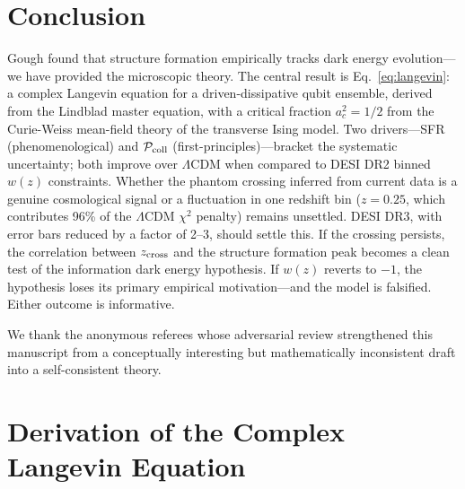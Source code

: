\documentclass[aps,prd,twocolumn,superscriptaddress]{revtex4-2}
\begin{document}
\section{Conclusion}

Gough \cite{Gough:2025} found that structure formation empirically tracks dark energy evolution---we have provided the microscopic theory. The central result is Eq.~\eqref{eq:langevin}: a complex Langevin equation for a driven-dissipative qubit ensemble, derived from the Lindblad master equation, with a critical fraction $a_c^2=1/2$ from the Curie-Weiss mean-field theory of the transverse Ising model. Two drivers---SFR (phenomenological) and $\mathcal{P}_{\rm coll}$ (first-principles)---bracket the systematic uncertainty; both improve over $\Lambda$CDM when compared to DESI DR2 binned $w(z)$ constraints. Whether the phantom crossing inferred from current data is a genuine cosmological signal or a fluctuation in one redshift bin ($z=0.25$, which contributes 96\% of the $\Lambda$CDM $\chi^2$ penalty) remains unsettled. DESI DR3, with error bars reduced by a factor of 2--3, should settle this. If the crossing persists, the correlation between $z_{\rm cross}$ and the structure formation peak becomes a clean test of the information dark energy hypothesis. If $w(z)$ reverts to $-1$, the hypothesis loses its primary empirical motivation---and the model is falsified. Either outcome is informative.

\begin{acknowledgments}
We thank the anonymous referees whose adversarial review strengthened this manuscript from a conceptually interesting but mathematically inconsistent draft into a self-consistent theory.
\end{acknowledgments}

\appendix

\section{Derivation of the Complex Langevin Equation}
\label{app:langevin}
\end{document}
